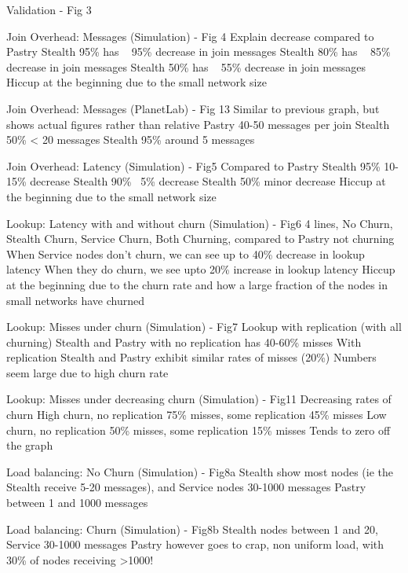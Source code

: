
Validation - Fig 3

Join Overhead: Messages (Simulation) - Fig 4
    Explain decrease compared to Pastry
    Stealth 95\% has ~ 95\% decrease in join messages
    Stealth 80\% has ~ 85\% decrease in join messages
    Stealth 50\% has ~ 55\% decrease in join messages
    Hiccup at the beginning due to the small network size

Join Overhead: Messages (PlanetLab) - Fig 13
    Similar to previous graph, but shows actual figures rather than relative
    Pastry 40-50 messages per join
    Stealth 50\% < 20 messages
    Stealth 95\% around 5 messages

Join Overhead: Latency (Simulation) - Fig5
    Compared to Pastry
    Stealth 95\% 10-15\% decrease
    Stealth 90\% ~5\% decrease
    Stealth 50\% minor decrease
    Hiccup at the beginning due to the small network size

Lookup: Latency with and without churn (Simulation) - Fig6
    4 lines, No Churn, Stealth Churn, Service Churn, Both Churning, compared to Pastry not churning
    When Service nodes don't churn, we can see up to 40\% decrease in lookup latency
    When they do churn, we see upto 20\% increase in lookup latency
    Hiccup at the beginning due to the churn rate and how a large fraction of the nodes in small networks have churned
    
Lookup: Misses under churn (Simulation) - Fig7
    Lookup with replication (with all churning)
    Stealth and Pastry with no replication has 40-60\% misses
    With replication Stealth and Pastry exhibit similar rates of misses (20\%)
    Numbers seem large due to high churn rate

Lookup: Misses under decreasing churn (Simulation) - Fig11
    Decreasing rates of churn
    High churn, no replication 75\% misses, some replication 45\% misses
    Low churn, no replication 50\% misses, some replication 15\% misses
    Tends to zero off the graph
    
Load balancing: No Churn (Simulation) - Fig8a
    Stealth show most nodes (ie the Stealth receive 5-20 messages), and Service nodes 30-1000 messages
    Pastry between 1 and 1000 messages

Load balancing: Churn (Simulation) - Fig8b
    Stealth nodes between 1 and 20, Service 30-1000 messages
    Pastry however goes to crap, non uniform load, with 30\% of nodes receiving >1000!


